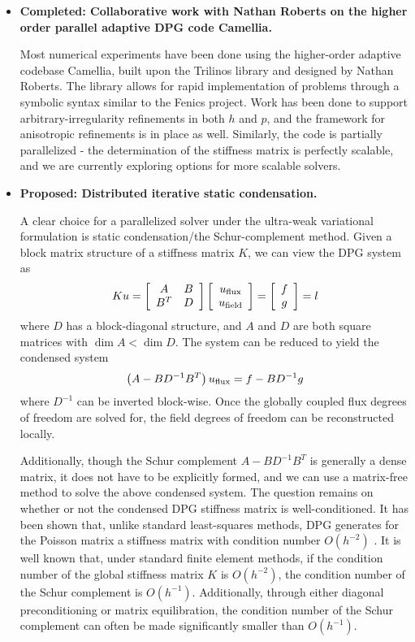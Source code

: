 \begin{itemize}
\item{\textbf{Completed: Collaborative work with Nathan Roberts on the higher order parallel adaptive DPG code Camellia.}}

Most numerical experiments have been done using the higher-order adaptive codebase Camellia, built upon the Trilinos library and designed by Nathan Roberts. The library allows for rapid implementation of problems through a symbolic syntax similar to the Fenics project. Work has been done to support arbitrary-irregularity refinements in both $h$ and $p$, and the framework for anisotropic refinements is in place as well. Similarly, the code is partially parallelized - the determination of the stiffness matrix is perfectly scalable, and we are currently exploring options for more scalable solvers. 

\item{\textbf{Proposed: Distributed iterative static condensation.}}

A clear choice for a parallelized solver under the ultra-weak variational formulation is static condensation/the Schur-complement method. Given a block matrix structure of a stiffness matrix $K$, we can view the DPG system as
\[
Ku = \arr{A}{B}{B^T}{D}\vecttwo{u_{\rm flux}}{u_{\rm field}} = \vecttwo{f}{g} = l
\]
where $D$ has a block-diagonal structure, and $A$ and $D$ are both square matrices with $\dim{A} < \dim{D}$. The system can be reduced to yield the condensed system
\[
\left(A-B D^{-1} B^T\right)u_{\rm flux} = f - B D^{-1} g
\]
where $D^{-1}$ can be inverted block-wise. Once the globally coupled flux degrees of freedom are solved for, the field degrees of freedom can be reconstructed locally. 

Additionally, though the Schur complement $A-B D^{-1} B^T$ is generally a dense matrix, it does not have to be explicitly formed, and we can use a matrix-free method to solve the above condensed system. The question remains on whether or not the condensed DPG stiffness matrix is well-conditioned. It has been shown that, unlike standard least-squares methods, DPG generates for the Poisson matrix a stiffness matrix with condition number $O(h^{-2})$ \cite{practicalDPG}. It is well known that, under standard finite element methods, if the condition number of the global stiffness matrix $K$ is $O(h^{-2})$, the condition number of the Schur complement is $O(h^{-1})$. Additionally, through either diagonal preconditioning or matrix equilibration, the condition number of the Schur complement can often be made significantly smaller than $O(h^{-1})$. 


\end{itemize}
